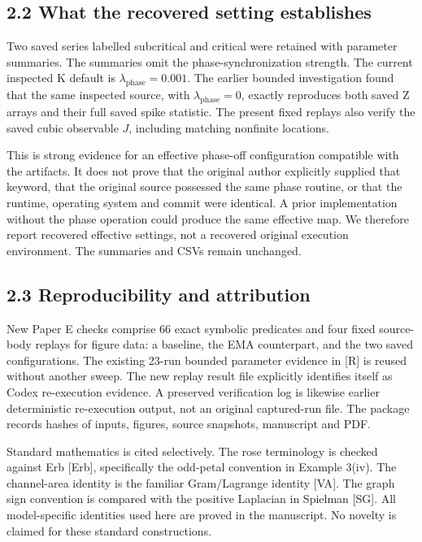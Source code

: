 \documentclass[
  11pt,
  a4paper,
]{article}
\begin{document}
\subsection{2.2 What the recovered setting establishes}\label{what-the-recovered-setting-establishes}

Two saved series labelled subcritical and critical were retained with parameter summaries. The summaries omit the phase-synchronization strength. The current inspected K default is \(\lambda_{\mathrm{phase}}=0.001\). The earlier bounded investigation found that the same inspected source, with \(\lambda_{\mathrm{phase}}=0\), exactly reproduces both saved Z arrays and their full saved spike statistic. The present fixed replays also verify the saved cubic observable \(J\), including matching nonfinite locations.

This is strong evidence for an effective phase-off configuration compatible with the artifacts. It does not prove that the original author explicitly supplied that keyword, that the original source possessed the same phase routine, or that the runtime, operating system and commit were identical. A prior implementation without the phase operation could produce the same effective map. We therefore report recovered effective settings, not a recovered original execution environment. The summaries and CSVs remain unchanged.

\subsection{2.3 Reproducibility and attribution}\label{reproducibility-and-attribution}

New Paper E checks comprise 66 exact symbolic predicates and four fixed source-body replays for figure data: a baseline, the EMA counterpart, and the two saved configurations. The existing 23-run bounded parameter evidence in {[}R{]} is reused without another sweep. The new replay result file explicitly identifies itself as Codex re-execution evidence. A preserved verification log is likewise earlier deterministic re-execution output, not an original captured-run file. The package records hashes of inputs, figures, source snapshots, manuscript and PDF.

Standard mathematics is cited selectively. The rose terminology is checked against Erb {[}Erb{]}, specifically the odd-petal convention in Example 3(iv). The channel-area identity is the familiar Gram/Lagrange identity {[}VA{]}. The graph sign convention is compared with the positive Laplacian in Spielman {[}SG{]}. All model-specific identities used here are proved in the manuscript. No novelty is claimed for these standard constructions.
\end{document}
